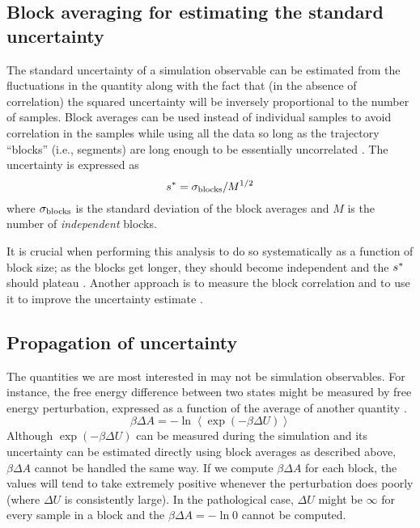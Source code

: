 \subsection{Block averaging for estimating the standard uncertainty}

The standard uncertainty of a simulation observable can be estimated from the fluctuations in the quantity along with the fact that (in the absence of correlation) the squared uncertainty will be inversely proportional to the number of samples.  Block averages can be used instead of individual samples to avoid correlation in the samples while using all the data so long as the trajectory ``blocks'' (i.e., segments) are long enough to be essentially uncorrelated \cite{Friedberg1970,Flyvbjerg-1989,FrenkelSmit2002,Grossfield2009}.  The uncertainty is expressed as
\begin{equation}
  s^* = \sigma_{\rm blocks}/M^{1/2}
\end{equation}
where $\sigma_{\rm blocks}$ is the standard deviation of the block averages and $M$ is the number of \emph{independent} blocks.

It is crucial when performing this analysis to do so systematically as a
function of block size; as the blocks get longer, they should become independent
and the $s^*$ should plateau \cite{Flyvbjerg-1989,Grossfield2009}.   Another
approach is to measure the block correlation and to use it to improve the
uncertainty estimate \cite{Kolafa1986}.

\subsection{Propagation of uncertainty}

The quantities we are most interested in may not be simulation observables.  For instance, the free energy difference between two states might be measured by free energy perturbation, expressed as a function of the average of another quantity \cite{Taylor1997}.
\begin{equation}
\beta \Delta A = -\ln \left< \exp \left(-\beta \Delta U\right) \right>
\end{equation}
Although $\exp(-\beta \Delta U)$ can be measured during the simulation and its uncertainty can be estimated directly using block averages as described above, $\beta \Delta A$ cannot be handled the same way.  If we compute $\beta \Delta A$ for each block, the values will tend to take extremely positive whenever the perturbation does poorly (where $\Delta U$ is consistently large).  In the pathological case, $\Delta U$ might be $\infty$ for every sample in a block and the $\beta \Delta A=-\ln 0$ cannot be computed.


